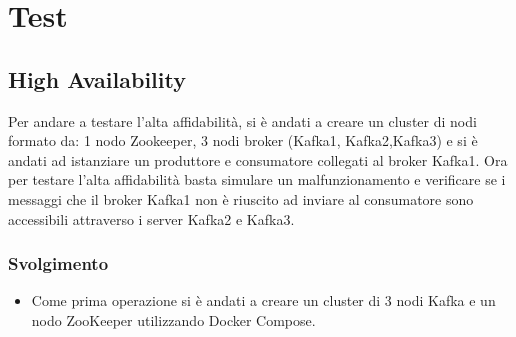 \documentclass{article}
\begin{document}
\section{Test}
\subsection{High Availability}
Per andare a testare l'alta affidabilità, si è andati a creare un cluster di nodi formato da: 1 nodo Zookeeper, 3 nodi broker (Kafka1, Kafka2,Kafka3) e si è andati ad istanziare un produttore e consumatore collegati al broker Kafka1. Ora per testare l'alta affidabilità basta simulare un malfunzionamento e verificare se i messaggi che il broker Kafka1 non è riuscito ad inviare al consumatore sono accessibili attraverso i server Kafka2 e Kafka3. 

\subsubsection{Svolgimento}
\begin{itemize}
    \item Come prima operazione si è andati a creare un cluster di 3 nodi Kafka e un nodo ZooKeeper utilizzando Docker Compose.
\end{itemize}
\end{document}
